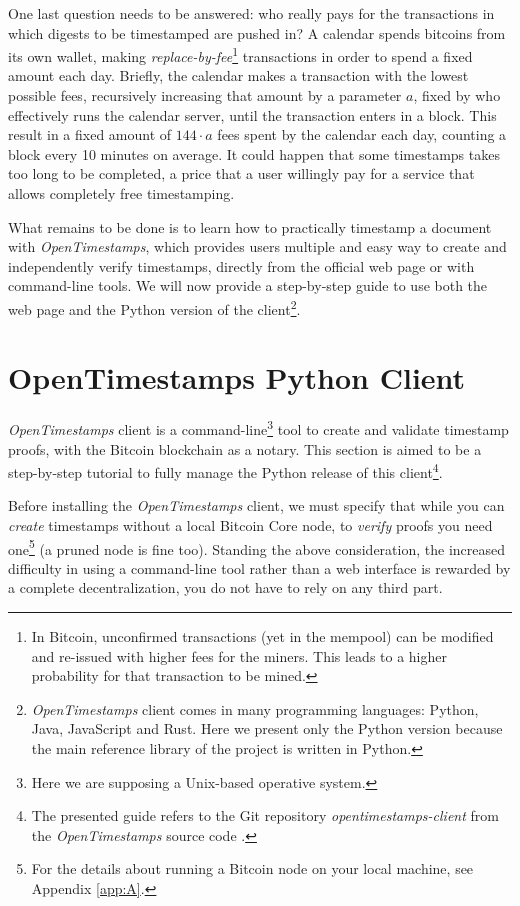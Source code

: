 \newpage
\noindent
One last question needs to be answered: who really pays for the transactions in which digests to be timestamped are pushed in? A calendar spends bitcoins from its own wallet, making \textit{replace-by-fee}\textup{\footnote{In Bitcoin, unconfirmed transactions (yet in the mempool) can be modified and re-issued with higher fees for the miners. This leads to a higher probability for that transaction to be mined.}} transactions in order to spend a fixed amount each day. Briefly, the calendar makes a transaction with the lowest possible fees, recursively increasing that amount by a parameter $a$, fixed by who effectively runs the calendar server, until the transaction enters in a block. This result in a fixed amount of $144 \cdot a$ fees spent by the calendar each day, counting a block every 10 minutes on average. It could happen that some timestamps takes too long to be completed, a price that a user willingly pay for a service that allows completely free timestamping.

\bigskip
\noindent
What remains to be done is to learn how to practically timestamp a document with \textit{OpenTimestamps}, which provides users multiple and easy way to create and independently verify timestamps, directly from the official web page \cite{OTSWeb} or with command-line tools. We will now provide a step-by-step guide to use both the web page and the Python version of the client\footnote{\textit{OpenTimestamps} client comes in many programming languages: Python, Java, JavaScript and Rust. Here we present only the Python version because the main reference library of the project is written in Python.}.

\bigskip
\section{OpenTimestamps Python Client}
\label{sec:ots-client}
\textit{OpenTimestamps} client is a command-line\footnote{Here we are supposing a Unix-based operative system.} tool to create and validate timestamp proofs, with the Bitcoin blockchain as a notary. This section is aimed to be a step-by-step tutorial to fully manage the Python release of this client\footnote{The presented guide refers to the Git repository \textit{opentimestamps-client} from the \textit{OpenTimestamps} source code \cite{OpenTimestampsGithub}.}.

\bigskip
\noindent
Before installing the \textit{OpenTimestamps} client, we must specify that while you can \textit{create} timestamps without a local Bitcoin Core node, to \textit{verify} proofs you need one\footnote{For the details about running a Bitcoin node on your local machine, see Appendix \ref{app:A}.} (a pruned node is fine too). Standing the above consideration, the increased difficulty in using a command-line tool rather than a web interface is rewarded by a complete decentralization, you do not have to rely on any third part.

